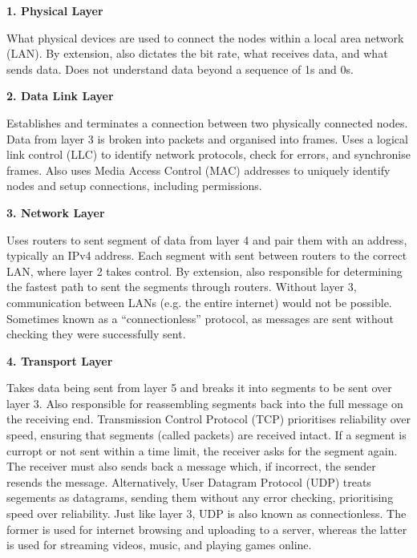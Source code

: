 \documentclass[11pt]{article}
\begin{document}
{\setlength{\parindent}{0cm}
\vspace{\baselineskip}
\textbf{1. Physical Layer}

What physical devices are used to connect the nodes within a local area network (LAN). By extension, also dictates the bit rate, what receives data, and what sends data. Does not understand data beyond a sequence of 1s and 0s.

\vspace{\baselineskip}
\textbf{2. Data Link Layer}

Establishes and terminates a connection between two physically connected nodes. Data from layer 3 is broken into packets and organised into frames. Uses a logical link control (LLC) to identify network protocols, check for errors, and synchronise frames. Also uses Media Access Control (MAC) addresses to uniquely identify nodes and setup connections, including permissions.

\vspace{\baselineskip}
\textbf{3. Network Layer}

Uses routers to sent segment of data from layer 4 and pair them with an address, typically an IPv4 address. Each segment with sent between routers to the correct LAN, where layer 2 takes control. By extension, also responsible for determining the fastest path to sent the segments through routers. Without layer 3, communication between LANs (e.g. the entire internet) would not be possible. Sometimes known as a ``connectionless'' protocol, as messages are sent without checking they were successfully sent.

\vspace{\baselineskip}
\textbf{4. Transport Layer}

Takes data being sent from layer 5 and breaks it into segments to be sent over layer 3. Also responsible for reassembling segments back into the full message on the receiving end. Transmission Control Protocol (TCP) prioritises reliability over speed, ensuring that segments (called packets) are received intact. If a segment is curropt or not sent within a time limit, the receiver asks for the segment again. The receiver must also sends back a message which, if incorrect, the sender resends the message. Alternatively, User Datagram Protocol (UDP) treats segements as datagrams, sending them without any error checking, prioritising speed over reliability. Just like layer 3, UDP is also known as connectionless. The former is used for internet browsing and uploading to a server, whereas the latter is used for streaming videos, music, and playing games online.

}
\end{document}
